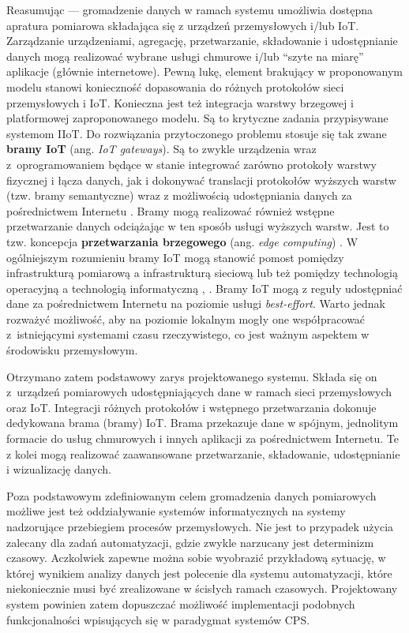 \documentclass[a4paper, 12pt, twoside]{article}
\begin{document}
Reasumując --- gromadzenie danych w ramach systemu umożliwia dostępna apratura pomiarowa
składająca się z urządzeń przemysłowych i/lub IoT. Zarządzanie urządzeniami, agregację, przetwarzanie, składowanie i udostępnianie
danych mogą realizować wybrane usługi chmurowe i/lub ``szyte na miarę'' aplikacje (głównie internetowe).
Pewną lukę, element brakujący w proponowanym modelu stanowi konieczność dopasowania
do różnych protokołów sieci przemysłowych i IoT. Konieczna jest też integracja
warstwy brzegowej i platformowej zaproponowanego modelu. Są to krytyczne zadania
przypisywane systemom IIoT. Do rozwiązania
przytoczonego problemu stosuje się tak zwane \textbf{bramy IoT} (ang. \emph{IoT gateways}). Są to zwykle
urządzenia wraz z~oprogramowaniem będące w stanie integrować zarówno protokoły
warstwy fizycznej i łącza danych, jak i dokonywać translacji protokołów wyższych warstw
(tzw. bramy semantyczne) wraz z możliwością udostępniania danych za pośrednictwem
Internetu \cite{iiot-heterogenous-gateways}. Bramy mogą realizować również
wstępne przetwarzanie danych odciążając w ten sposób usługi wyższych warstw.
Jest to tzw. koncepcja \textbf{przetwarzania brzegowego} (ang. \emph{edge computing}) \cite{iot-gateway-medical-and-industrial}.
W ogólniejszym rozumieniu bramy IoT mogą stanowić pomost pomiędzy infrastrukturą
pomiarową a infrastrukturą sieciową lub też pomiędzy technologią operacyjną a
technologią informatyczną \cite{iiot-gateway-introduction}, \cite{iiot-challenges-opportunities-directions}.
Bramy IoT mogą z reguły udostępniać dane za pośrednictwem Internetu na poziomie usługi \emph{best-effort}.
Warto jednak rozważyć możliwość, aby na poziomie lokalnym mogły one współpracować z~istniejącymi
systemami czasu rzeczywistego, co jest ważnym aspektem w środowisku przemysłowym.

Otrzymano zatem podstawowy zarys projektowanego systemu.
Składa się on z~urządzeń pomiarowych udostępniających dane w ramach sieci
przemysłowych oraz IoT. Integracji różnych protokołów i wstępnego przetwarzania
dokonuje dedykowana brama (bramy) IoT. Brama przekazuje dane w spójnym, jednolitym
formacie do usług chmurowych i innych aplikacji za pośrednictwem Internetu.
Te z kolei mogą realizować zaawansowane przetwarzanie, składowanie, udostępnianie
i wizualizację danych.

Poza podstawowym zdefiniowanym celem gromadzenia danych pomiarowych
możliwe jest też oddziaływanie systemów informatycznych na systemy nadzorujące
przebiegiem procesów przemysłowych. Nie jest to przypadek użycia
zalecany dla zadań automatyzacji, gdzie zwykle narzucany jest determinizm czasowy.
Aczkolwiek zapewne można sobie wyobrazić przykładową sytuację, w której wynikiem analizy danych jest
polecenie dla systemu automatyzacji, które niekoniecznie musi
być zrealizowane w ścisłych ramach czasowych. Projektowany system powinien zatem dopuszczać
możliwość implementacji podobnych funkcjonalności wpisujących się w paradygmat
systemów CPS.
\end{document}

